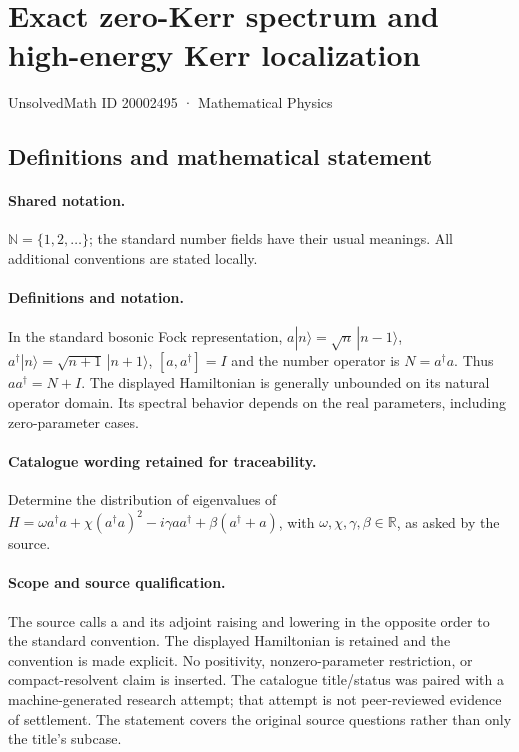\documentclass[11pt]{article}
\begin{document}
\setcounter{section}{20002494}
\section{Exact zero-Kerr spectrum and high-energy Kerr localization}\label{20002495}
{\small UnsolvedMath ID 20002495 · Mathematical Physics}
\subsection{Definitions and mathematical statement}

\paragraph{Shared notation.}$\mathbb N=\{1,2,\ldots\}$; the standard number fields have their usual meanings. All additional conventions are stated locally.


\paragraph{Definitions and notation.}In the standard bosonic Fock representation, $a|n\rangle=\sqrt n\,|n-1\rangle$, $a^\dagger|n\rangle=\sqrt{n+1}\,|n+1\rangle$, $[a,a^\dagger]=I$ and the number operator is $N=a^\dagger a$. Thus $aa^\dagger=N+I$. The displayed Hamiltonian is generally unbounded on its natural operator domain. Its spectral behavior depends on the real parameters, including zero-parameter cases.

\paragraph{Catalogue wording retained for traceability.}
Determine the distribution of eigenvalues of $H=\omega a^\dagger a+\chi(a^\dagger a)^2-i\gamma aa^\dagger+\beta(a^\dagger+a)$, with $\omega,\chi,\gamma,\beta\in\mathbb R$, as asked by the source.
\paragraph{Scope and source qualification.}The source calls a and its adjoint raising and lowering in the opposite order to the standard convention. The displayed Hamiltonian is retained and the convention is made explicit. No positivity, nonzero-parameter restriction, or compact-resolvent claim is inserted. The catalogue title/status was paired with a machine-generated research attempt; that attempt is not peer-reviewed evidence of settlement. The statement covers the original source questions rather than only the title’s subcase.
\end{document}
